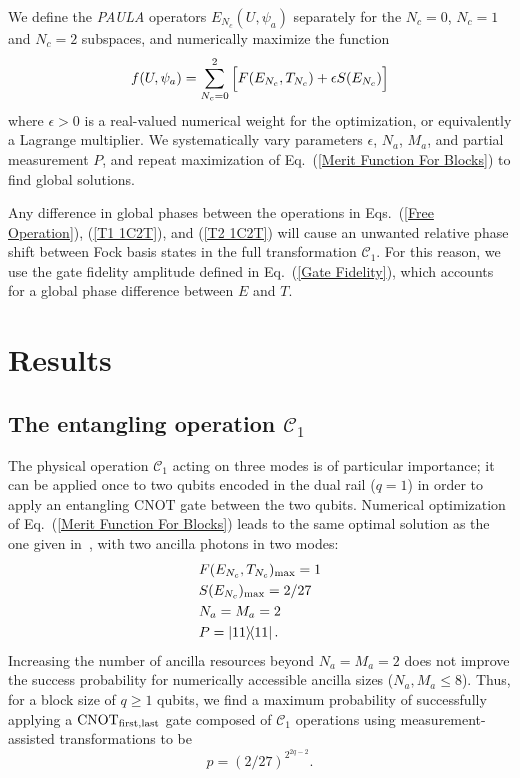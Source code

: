 \documentclass[aps,pra,twocolumn,superscriptaddress,floatfix,10pt]{revtex4}
\begin{document}
We define the \textit{PAULA} operators $E_{N_c}(U,\psi_a)$ separately for the $N_c=0$, $N_c=1$ and $N_c=2$ subspaces,
and numerically maximize the function
\begin{equation}
\label{Merit Function For Blocks}
\small f(U,\psi_a) = \sum_{N_c=0}^{2} \Big[ F(E_{N_c},T_{N_c}) + \epsilon S(E_{N_c}) \Big]
\end{equation}
where $\epsilon > 0$ is a real-valued numerical weight for the optimization, or equivalently a Lagrange multiplier. We systematically vary parameters $\epsilon$, $N_a$, $M_a$, and partial measurement $P$, and repeat maximization of Eq.~(\ref{Merit Function For Blocks}) to find global solutions.

Any difference in global phases between the operations in Eqs.~(\ref{Free Operation}), (\ref{T1 1C2T}), and (\ref{T2 1C2T}) will cause an unwanted relative phase shift between Fock basis states in the full transformation $\mathcal{C}_1$. For this reason, we use the gate fidelity amplitude defined in Eq.~(\ref{Gate Fidelity}), which accounts for a global phase difference between $E$ and $T$. 
\section{Results}
\label{Section on Results}
\subsection{The entangling operation $\mathcal{C}_1$}
The physical operation $\mathcal{C}_1$ acting on three modes is of particular importance; it can be applied once to two qubits encoded in the dual rail ($q=1$) in order to apply an entangling $\mbox{CNOT}$ gate between the two qubits. Numerical optimization of Eq.~(\ref{Merit Function For Blocks}) leads to the same optimal solution as the one given in~\cite{Uskov}, with two ancilla photons in two modes:
\begin{eqnarray}
& F(E_{N_c},T_{N_c})_{\rm max} = 1 \nonumber \\
& S(E_{N_c})_{\rm max} = 2/27 \\
& N_a=M_a=2 \nonumber \\
& P = \outerproduct{11}{11} \nonumber	.
\end{eqnarray}
Increasing the number of ancilla resources beyond $N_a=M_a=2$ does not improve the success probability for numerically accessible ancilla sizes ($N_a,M_a \le 8$). Thus, for a block size of $q \ge 1$ qubits, we find a maximum probability of successfully applying a $\mbox{CNOT}_{\rm first,last}$ gate composed of $\mathcal{C}_1$ operations using measurement-assisted transformations to be
\begin{equation}
\label{1C2T Result}
p = (2/27)^{2^{2q-2}}.
\end{equation}
\end{document}
